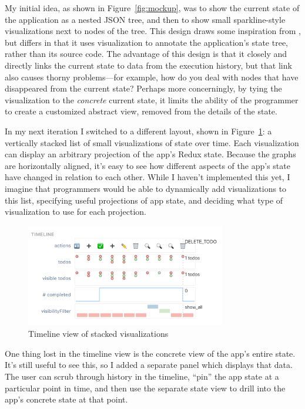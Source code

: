 \documentclass{sigchi}
\begin{document}
My initial idea, as shown in Figure~\ref{fig:mockup}, was to show the
current state of the application as a nested JSON tree, and then to show
small sparkline-style visualizations next to nodes of the tree. This
design draws some inspiration from \autocite{hoffswell2018a}, but
differs in that it uses visualization to annotate the application's
state tree, rather than its source code. The advantage of this design is
that it closely and directly links the current state to data from the
execution history, but that link also causes thorny problems---for
example, how do you deal with nodes that have disappeared from the
current state? Perhaps more concerningly, by tying the visualization to
the \emph{concrete} current state, it limits the ability of the
programmer to create a customized abstract view, removed from the
details of the state.

In my next iteration I switched to a different layout, shown in
Figure~\ref{fig:timeline}: a vertically stacked list of small
visualizations of state over time. Each visualization can display an
arbitrary projection of the app's Redux state. Because the graphs are
horizontally aligned, it's easy to see how different aspects of the
app's state have changed in relation to each other. While I haven't
implemented this yet, I imagine that programmers would be able to
dynamically add visualizations to this list, specifying useful
projections of app state, and deciding what type of visualization to use
for each projection.

\begin{figure}
\hypertarget{fig:timeline}{%
\centering
\includegraphics[width=3.4375in,height=1.77083in]{images/timeline.png}
\caption{Timeline view of stacked visualizations}\label{fig:timeline}
}
\end{figure}

One thing lost in the timeline view is the concrete view of the app's
entire state. It's still useful to see this, so I added a separate panel
which displays that data. The user can scrub through history in the
timeline, ``pin'' the app state at a particular point in time, and then
use the separate state view to drill into the app's concrete state at
that point.
\end{document}
